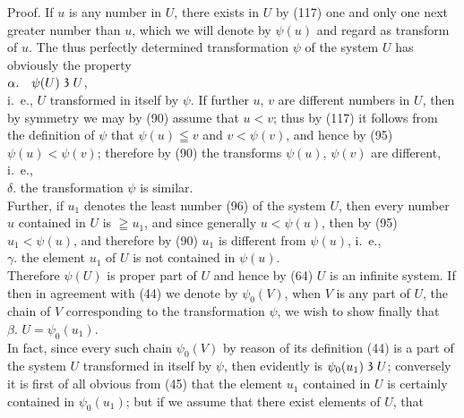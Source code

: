 \documentclass[oneside]{book}
\newcommand\partof{\mathrel{\raisebox{0.45ex}{$\mathfrak{3}$}}}   %
\begin{document}
Proof. If $u$ is any number in $U$, there exists in $U$
by (117) one and only one next greater number than
$u$, which we will denote by $\psi(u)$ and regard as transform
of $u$. The thus perfectly determined transformation
$\psi$ of the system $U$ has obviously the property
\\ \null\hfill
$\alpha.\quad \psi(U) \partof U$,
\hfill\null\\
i.~e., $U$ transformed in itself by $\psi$. If further $u$, $v$
are different numbers in $U$, then by symmetry we may
by (90) assume that $u<v$; thus by (117) it follows
from the definition of $\psi$ that $\psi(u) \leqq v$ and $v < \psi(v)$,
and hence by (95) $\psi(u) < \psi(v)$; therefore by (90) the
transforms $\psi(u)$, $\psi(v)$ are different, i.~e.,
\\ \null\hfill
$\delta$. the transformation $\psi$ is similar.
\hfill\null\\
Further, if $u_1$ denotes the least number (96) of the
system $U$, then every number $u$ contained in $U$ is
$\geqq u_1$, and since generally $u < \psi(u)$, then by (95) $u_1<\psi(u)$,
and therefore by (90) $u_1$ is different from $\psi(u)$,
i.~e.,
\\ \null\hfill
$\gamma$. the element $u_1$ of $U$ is not contained in $\psi(u)$.
\hfill\null\\
Therefore $\psi(U)$ is proper part of $U$ and hence by (64)
$U$ is an infinite system. If then in agreement with
(44) we denote by $\psi_0(V)$, when $V$ is any part of $U$,
the chain of $V$ corresponding to the transformation $\psi$,
we wish to show finally that
\\ \null\hfill
$\beta$. $U=\psi_0(u_1)$.
\hfill\null\\
In fact, since every such chain $\psi_0(V)$ by reason of its
definition (44) is a part of the system $U$ transformed
in itself by $\psi$, then evidently is $\psi_0(u_1) \partof U$; conversely
it is first of all obvious from (45) that the element $u_1$
contained in $U$ is certainly contained in $\psi_0(u_1)$; but
if we assume that there exist elements of $U$, that
\end{document}
